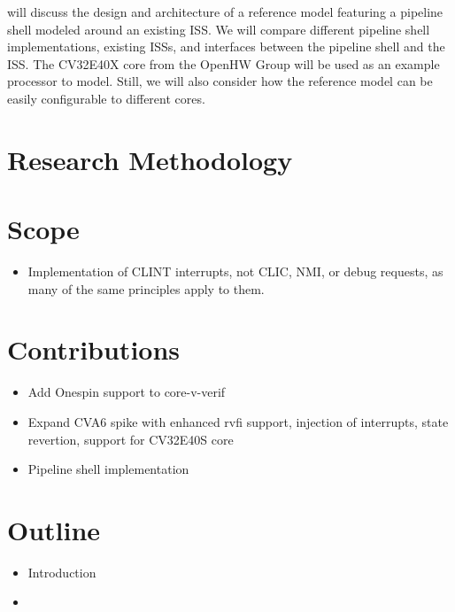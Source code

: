  will discuss the design and architecture of a reference model featuring a pipeline shell modeled around an existing ISS. We will compare different pipeline shell implementations, existing ISSs, and interfaces between the pipeline shell and the ISS. The CV32E40X core from the OpenHW Group will be used as an example processor to model. Still, we will also consider how the reference model can be easily configurable to different cores.



%    

\section{Research Methodology}


\section{Scope}

\begin{itemize}
    \item Implementation of CLINT interrupts, not CLIC, NMI, or debug requests, as many of the same principles apply to them. 
\end{itemize}

\section{Contributions}

\begin{itemize}
    \item Add Onespin support to core-v-verif
    \item Expand CVA6 spike with enhanced rvfi support, injection of interrupts, state revertion, support for CV32E40S core
    \item Pipeline shell implementation
\end{itemize}


\section{Outline}

\begin{itemize}
    \item Introduction
    \item 
\end{itemize}

